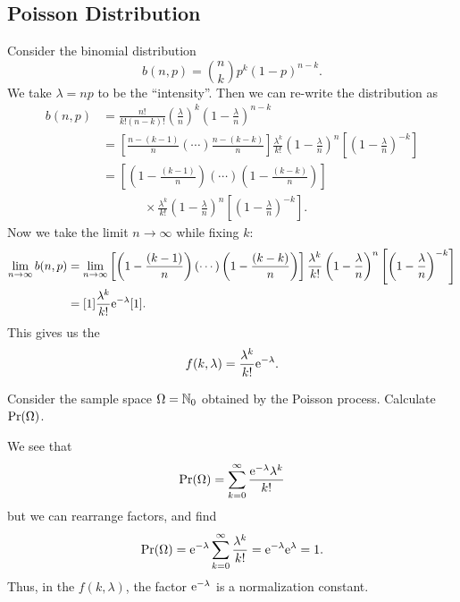 \subsection{Poisson Distribution}
Consider the binomial distribution
\begin{equation}
b(n,p) = \binom{n}{k}p^{k}(1-p)^{n-k}.
\end{equation}
We take $\lambda=np$ to be the ``intensity''. Then we can re-write the
distribution as
\begin{subequations}
\begin{align}
b(n,p) &= \frac{n!}{k!(n-k)!}\left(\frac{\lambda}{n}\right)^{k}
\left(1-\frac{\lambda}{n}\right)^{n-k}\\
&=\left[\frac{n-(k-1)}{n}(\cdots)\frac{n-(k-k)}{n}\right]\frac{\lambda^{k}}{k!}\left(1-\frac{\lambda}{n}\right)^{n}\left[\left(1-\frac{\lambda}{n}\right)^{-k}\right]\\
&=\left[\left(1-\frac{(k-1)}{n}\right)(\cdots)\left(1-\frac{(k-k)}{n}\right)\right]\nonumber\\
&\phantom{=}\qquad\times\frac{\lambda^{k}}{k!}\left(1-\frac{\lambda}{n}\right)^{n}\left[\left(1-\frac{\lambda}{n}\right)^{-k}\right].
\end{align}
\end{subequations}
Now we take the limit $n\to\infty$ while fixing $k$:
\begin{align}
\lim_{n\to\infty}b(n,p)&=\lim_{n\to\infty}\left[\left(1-\frac{(k-1)}{n}\right)(\cdots)\left(1-\frac{(k-k)}{n}\right)\right]\frac{\lambda^{k}}{k!}\left(1-\frac{\lambda}{n}\right)^{n}\left[\left(1-\frac{\lambda}{n}\right)^{-k}\right]\nonumber\\
&=[1]\frac{\lambda^{k}}{k!}\mathrm{e}^{-\lambda}[1].
\end{align}
This gives us the 
\begin{equation}
f(k,\lambda)=\frac{\lambda^{k}}{k!}\mathrm{e}^{-\lambda}.
\end{equation}

\begin{xca}
Consider the sample space $\Omega=\mathbb{N}_{0}$ obtained by the Poisson
process. Calculate $\mathop{\mathrm{Pr}}\nolimits(\Omega)$.
\end{xca}
We see that
\begin{equation}
\mathop{\mathrm{Pr}}\nolimits(\Omega)
= \sum_{k=0}^{\infty}\frac{\mathrm{e}^{-\lambda}\lambda^{k}}{k!}
\end{equation}
but we can rearrange factors, and find
\begin{equation}
\mathop{\mathrm{Pr}}\nolimits(\Omega)
= \mathrm{e}^{-\lambda}\sum^{\infty}_{k=0}\frac{\lambda^{k}}{k!}=\mathrm{e}^{-\lambda}\mathrm{e}^{\lambda}=1.
\end{equation}
Thus, in the $f(k,\lambda)$, the factor $\mathrm{e}^{-\lambda}$ is a
normalization constant. 


